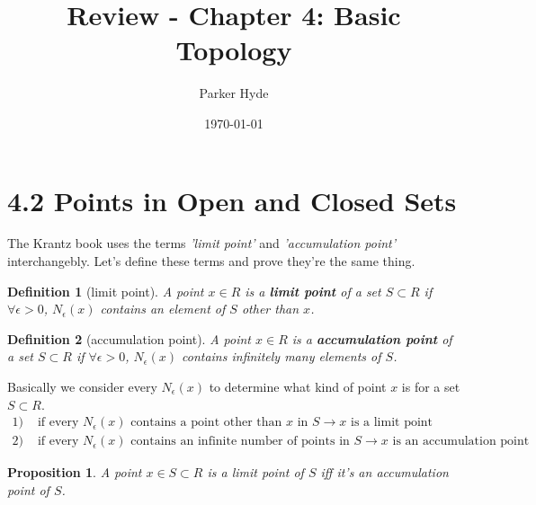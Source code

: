 \documentclass{article}
\begin{document}
\title{Review - Chapter 4: Basic Topology}
\author{Parker Hyde}
\date{\today}
\maketitle

\newtheorem{theorem}{Theorem}
\newtheorem{definition}{Definition}
\newtheorem{exmp}{Example}
\newtheorem{proposition}{Proposition}
\newtheorem{lemma}{Lemma}
\newtheorem{corollary}{Corollary}
\newtheorem{remark}{Remark}

\section*{4.2 Points in Open and Closed Sets}

The Krantz book uses the terms \textit{'limit point'} and \textit{'accumulation point'}
interchangebly. Let's define these terms and prove they're the same thing.


\begin{definition}[limit point]
    A point \( x \in R \) is a \textbf{limit point} of a set \( S \subset R \) 
    if \( \forall \epsilon > 0\),  \( N_\epsilon(x) \) contains an element of 
     \( S \) other than \( x \).
\end{definition}
\begin{definition}[accumulation point]
    A point \( x \in R \) is a \textbf{accumulation point} of a set \( S \subset R \) 
    if \( \forall \epsilon > 0\),  \( N_\epsilon(x) \) contains infinitely many elements 
    of \( S \).
\end{definition}

Basically we consider every \( N_\epsilon(x) \) to determine what kind of point
\( x \) is for a set \( S \subset R \).
\begin{align*}
    1) & \text{ if every } N_\epsilon(x) \text{ contains a point other than } x \text{ in } S \rightarrow x \text{ is a limit point}\\
    2) & \text{ if every } N_\epsilon(x) \text{ contains an infinite number of points} \text{ in } S \rightarrow x \text{ is an accumulation point}
\end{align*}

\begin{proposition}
   A point \( x \in S \subset R \) is a limit point of \( S \) iff it's an
   accumulation point of \( S \).
\end{proposition}
\end{document}

